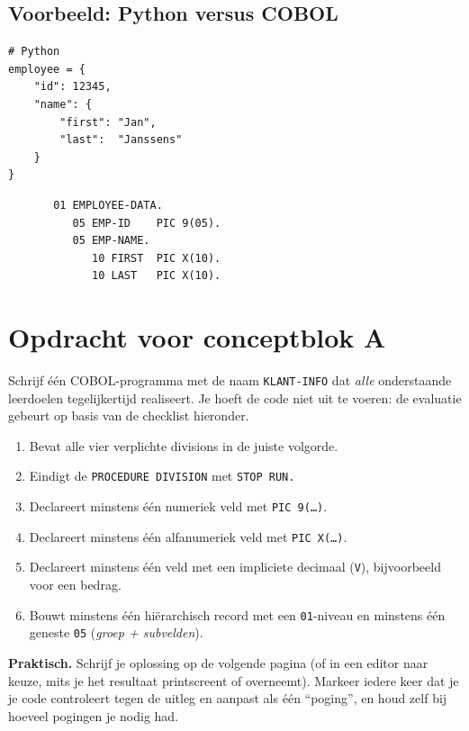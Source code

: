 \documentclass[11pt,a4paper]{article}
\begin{document}
\subsection*{Voorbeeld: Python versus COBOL}

\begin{lstlisting}
# Python
employee = {
    "id": 12345,
    "name": {
        "first": "Jan",
        "last":  "Janssens"
    }
}
\end{lstlisting}

\begin{lstlisting}
       01 EMPLOYEE-DATA.
          05 EMP-ID    PIC 9(05).
          05 EMP-NAME.
             10 FIRST  PIC X(10).
             10 LAST   PIC X(10).
\end{lstlisting}

\newpage
\section{Opdracht voor conceptblok A}
\label{sec:opdracht-A}

Schrijf één COBOL-programma met de naam \texttt{KLANT-INFO} dat \emph{alle} onderstaande leerdoelen tegelijkertijd realiseert. 
Je hoeft de code niet uit te voeren: de evaluatie gebeurt op basis van de checklist hieronder.

\begin{enumerate}
    \item Bevat alle vier verplichte divisions in de juiste volgorde.
    \item Eindigt de \texttt{PROCEDURE DIVISION} met \texttt{STOP RUN.}
    \item Declareert minstens één numeriek veld met \texttt{PIC 9(\ldots{})}.
    \item Declareert minstens één alfanumeriek veld met \texttt{PIC X(\ldots{})}.
    \item Declareert minstens één veld met een impliciete decimaal (\texttt{V}), bijvoorbeeld voor een bedrag.
    \item Bouwt minstens één hiërarchisch record met een \texttt{01}-niveau en minstens één geneste \texttt{05} (\textit{groep + subvelden}).
\end{enumerate}

\textbf{Praktisch.} Schrijf je oplossing op de volgende pagina (of in een editor naar keuze, mits je het resultaat printscreent of overneemt). 
Markeer iedere keer dat je je code controleert tegen de uitleg en aanpast als één ``poging'', en houd zelf bij hoeveel pogingen je nodig had.
\end{document}
